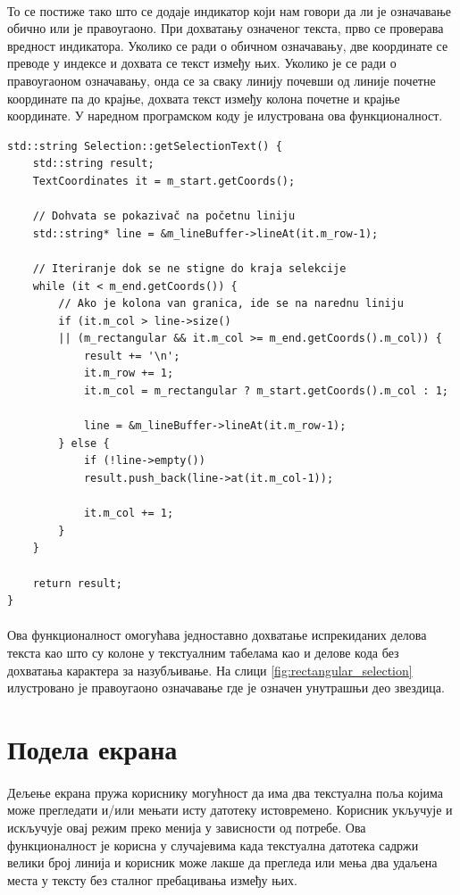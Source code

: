 \documentclass[12pt,oneside]{memoir}
\begin{document}
\paragraph{}
То се постиже тако што се додаје индикатор који нам говори да ли
је означавање обично или је правоугаоно. При дохватању означеног
текста, прво се проверава вредност индикатора. Уколико се ради о обичном
означавању, две координате се преводе у индексе и дохвата се текст између
њих. Уколико је се ради о правоугаоном означавању, онда се за сваку линију
почевши од линије почетне координате па до крајње, дохвата текст између колона
почетне и крајње координате. У наредном програмском коду је илустрована ова
функционалност.

\begin{verbatim}
std::string Selection::getSelectionText() {
	std::string result;
	TextCoordinates it = m_start.getCoords();
	
	// Dohvata se pokazivač na početnu liniju
	std::string* line = &m_lineBuffer->lineAt(it.m_row-1);
	
	// Iteriranje dok se ne stigne do kraja selekcije
	while (it < m_end.getCoords()) {
		// Ako je kolona van granica, ide se na narednu liniju
		if (it.m_col > line->size() 
		|| (m_rectangular && it.m_col >= m_end.getCoords().m_col)) {
			result += '\n';
			it.m_row += 1;
			it.m_col = m_rectangular ? m_start.getCoords().m_col : 1;
			
			line = &m_lineBuffer->lineAt(it.m_row-1);
		} else {
			if (!line->empty())
			result.push_back(line->at(it.m_col-1));
			
			it.m_col += 1;
		}
	}
	
	return result;
}
\end{verbatim}

\paragraph{}
Ова функционалност омогућава једноставно дохватање испрекиданих делова
текста као што су колоне у текстуалним табелама као и делове кода без дохватања
карактера за назубљивање. На слици \ref{fig:rectangular_selection} илустровано
је правоугаоно означавање где је означен унутрашњи део звездица.

\section{Подела екрана}

\paragraph{}
Дељење екрана пружа кориснику могућност да има два текстуална поља
којима може прегледати и/или мењати исту датотеку истовремено. Корисник укључује и искључује овај режим преко менија у зависности од потребе. Ова функционалност је корисна у случајевима када текстуална датотека садржи велики број линија и корисник може лакше да прегледа или мења два удаљена места у тексту без сталног пребацивања између њих.
\end{document}
